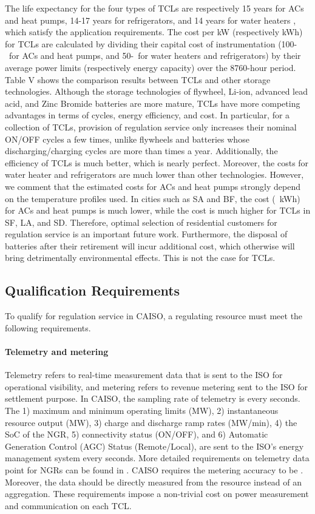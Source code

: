 \documentclass[onecolumn,journal]{IEEEtran}
\begin{document}
\begin{table}[tb]
The life expectancy for the four types of \acp{TCL} are respectively 15 years for ACs and heat pumps, 14-17 years for refrigerators, and 14 years for water heaters \cite{TCL_life}, which satisfy the application requirements. The cost per kW (respectively kWh) for TCLs are calculated by dividing their capital cost of instrumentation (100-\ for ACs and heat pumps, and 50-\ for water heaters and refrigerators) by their average power limits (respectively energy capacity) over the 8760-hour period. Table V shows the comparison results between \acp{TCL} and other storage technologies. Although the storage technologies of flywheel, Li-ion, advanced lead acid, and  Zinc Bromide batteries are more mature,  \acp{TCL} have more competing advantages in terms of cycles, energy efficiency, and cost. In particular, for a collection of \acp{TCL}, provision of regulation service only increases their nominal ON/OFF cycles a few times, unlike flywheels and batteries whose discharging/charging cycles are more than  times a year. Additionally, the efficiency of \acp{TCL} is much better, which is nearly perfect. Moreover, the costs for water heater and refrigerators are much lower than other technologies. However, we comment that the estimated costs for ACs and heat pumps strongly depend on the temperature profiles used. In cities such as SA and BF, the cost (\ kWh) for ACs and heat pumps is much lower, while the cost is much higher for TCLs in SF, LA, and SD. Therefore, optimal selection of residential customers for regulation service is an important future work. Furthermore, the disposal of batteries after their retirement will incur additional cost, which otherwise will bring detrimentally environmental effects. This is not the case for TCLs.

\subsection{Qualification Requirements}\label{sec:qualification}
To qualify for regulation service in \ac{CAISO}, a regulating resource must meet the following requirements.

\paragraph{Telemetry and metering} Telemetry refers to real-time measurement data that is sent to the ISO for operational visibility, and metering refers to revenue metering sent to the ISO for settlement purpose.  In \ac{CAISO}, the sampling rate of telemetry is every  seconds. The 1) maximum and minimum operating limits (MW), 2) instantaneous resource output (MW), 3) charge and discharge ramp rates (MW/min), 4) the SoC of the NGR, 5) connectivity status (ON/OFF), and 6) Automatic Generation Control (AGC) Status (Remote/Local), are sent to the ISO's energy management system every  seconds. More detailed requirements on telemetry data point for NGRs can be found in \cite{CAISO_Telemetry}. \ac{CAISO} requires the metering accuracy to be . Moreover, the data should be directly measured from the resource instead of an aggregation. These requirements impose a non-trivial cost on power measurement and communication on each \ac{TCL}.


\end{table}
\end{document}
